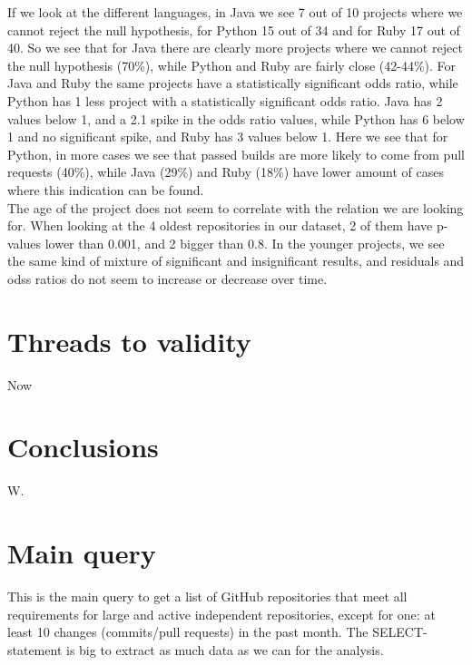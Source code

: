 \documentclass[a4paper,11pt]{article}
\begin{document}
			If we look at the different languages, in Java we see 7 out of 10 projects where we cannot reject the null hypothesis, for Python 15 out of 34 and for Ruby 17 out of 40. So we see that for Java there are clearly more projects where we cannot reject the null hypothesis (70\%), while Python and Ruby are fairly close (42-44\%). For Java and Ruby the same projects have a statistically significant odds ratio, while Python has 1 less project with a statistically significant odds ratio. Java has 2 values below 1, and a 2.1 spike in the odds ratio values, while Python has 6 below 1 and no significant spike, and Ruby has 3 values below 1. Here we see that for Python, in more cases we see that passed builds are more likely to come from pull requests (40\%), while Java (29\%) and Ruby (18\%) have lower amount of cases where this indication can be found. \\

			The age of the project does not seem to correlate with the relation we are looking for. When looking at the 4 oldest repositories in our dataset, 2 of them have p-values lower than 0.001, and 2 bigger than 0.8. In the younger projects, we see the same kind of mixture of significant and insignificant results, and residuals and odss ratios do not seem to increase or decrease over time. \\

			
			
	\section{Threads to validity}
		Now 
	
	\section{Conclusions}
		W.

	\appendix
	\section{Main query}
	\label{app:mainquery}
	This is the main query to get a list of GitHub repositories that meet all requirements for large and active independent repositories, except for one: at least 10 changes (commits/pull requests) in the past month. The SELECT-statement is big to extract as much data as we can for the analysis.
	
\end{document}
